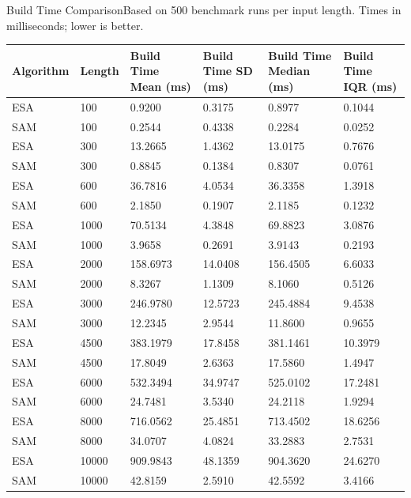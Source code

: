\begin{benchmarktable}{Build Time Comparison}{Based on 500 benchmark runs per input length. Times in milliseconds; lower is better.}
\begin{tabularx}{\textwidth}{|X|X|X|X|X|X|}
\toprule
Algorithm & Length & Build Time Mean (ms) & Build Time SD (ms) & Build Time Median (ms) & Build Time IQR (ms) \\
\midrule
ESA & 100 & 0.9200 & 0.3175 & 0.8977 & 0.1044 \\
SAM & 100 & 0.2544 & 0.4338 & 0.2284 & 0.0252 \\
\hline
ESA & 300 & 13.2665 & 1.4362 & 13.0175 & 0.7676 \\
SAM & 300 & 0.8845 & 0.1384 & 0.8307 & 0.0761 \\
\hline
ESA & 600 & 36.7816 & 4.0534 & 36.3358 & 1.3918 \\
SAM & 600 & 2.1850 & 0.1907 & 2.1185 & 0.1232 \\
\hline
ESA & 1000 & 70.5134 & 4.3848 & 69.8823 & 3.0876 \\
SAM & 1000 & 3.9658 & 0.2691 & 3.9143 & 0.2193 \\
\hline
ESA & 2000 & 158.6973 & 14.0408 & 156.4505 & 6.6033 \\
SAM & 2000 & 8.3267 & 1.1309 & 8.1060 & 0.5126 \\
\hline
ESA & 3000 & 246.9780 & 12.5723 & 245.4884 & 9.4538 \\
SAM & 3000 & 12.2345 & 2.9544 & 11.8600 & 0.9655 \\
\hline
ESA & 4500 & 383.1979 & 17.8458 & 381.1461 & 10.3979 \\
SAM & 4500 & 17.8049 & 2.6363 & 17.5860 & 1.4947 \\
\hline
ESA & 6000 & 532.3494 & 34.9747 & 525.0102 & 17.2481 \\
SAM & 6000 & 24.7481 & 3.5340 & 24.2118 & 1.9294 \\
\hline
ESA & 8000 & 716.0562 & 25.4851 & 713.4502 & 18.6256 \\
SAM & 8000 & 34.0707 & 4.0824 & 33.2883 & 2.7531 \\
\hline
ESA & 10000 & 909.9843 & 48.1359 & 904.3620 & 24.6270 \\
SAM & 10000 & 42.8159 & 2.5910 & 42.5592 & 3.4166 \\
\bottomrule
\end{tabularx}
\end{benchmarktable}

